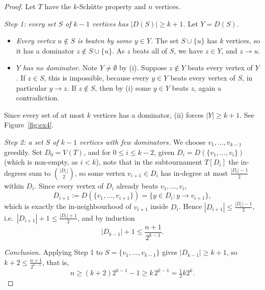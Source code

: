 \documentclass[a4paper,12pt]{article}
\begin{document}
\begin{proof}
	Let $T$ have the $k$-Sch\"utte property and $n$ vertices.

	\emph{Step 1: every set $S$ of $k-1$ vertices has $|D(S)| \ge k+1$.} Let $Y = D(S)$.
	\begin{itemize}
		\item[(i)] \emph{Every vertex $u \notin S$ is beaten by some $y \in Y$.} The set $S \cup \{u\}$ has $k$ vertices, so it has a dominator $z \notin S \cup \{u\}$. As $z$ beats all of $S$, we have $z \in Y$, and $z \to u$.
		\item[(ii)] \emph{$Y$ has no dominator.} Note $Y \ne \emptyset$ by (i). Suppose $z \notin Y$ beats every vertex of $Y$. If $z \in S$, this is impossible, because every $y \in Y$ beats every vertex of $S$, in particular $y \to z$. If $z \notin S$, then by (i) some $y \in Y$ beats $z$, again a contradiction.
	\end{itemize}
	Since every set of at most $k$ vertices has a dominator, (ii) forces $|Y| \ge k+1$. See Figure~\ref{fig:ex4}.

	\emph{Step 2: a set $S$ of $k-1$ vertices with few dominators.} We choose $v_1, \dots, v_{k-1}$ greedily. Set $D_0 = V(T)$, and for $0 \le i \le k-2$, given $D_i = D(\{v_1, \dots, v_i\})$ (which is non-empty, as $i < k$), note that in the subtournament $T[D_i]$ the in-degrees sum to $\binom{|D_i|}{2}$, so some vertex $v_{i+1} \in D_i$ has in-degree at most $\frac{|D_i| - 1}{2}$ within $D_i$. Since every vertex of $D_i$ already beats $v_1, \dots, v_i$,
	\[
		D_{i+1} := D(\{v_1, \dots, v_{i+1}\}) = \{ y \in D_i : y \to v_{i+1} \},
	\]
	which is exactly the in-neighbourhood of $v_{i+1}$ inside $D_i$. Hence $|D_{i+1}| \le \frac{|D_i| - 1}{2}$, i.e.\ $|D_{i+1}| + 1 \le \frac{|D_i| + 1}{2}$, and by induction
	\[
		|D_{k-1}| + 1 \le \frac{n+1}{2^{k-1}}.
	\]

	\emph{Conclusion.} Applying Step 1 to $S = \{v_1, \dots, v_{k-1}\}$ gives $|D_{k-1}| \ge k+1$, so $k + 2 \le \frac{n+1}{2^{k-1}}$, that is,
	\[
		n \ge (k+2) 2^{k-1} - 1 \ge k\, 2^{k-1} = \tfrac12 k 2^k.
	\]
\end{proof}
\end{document}
